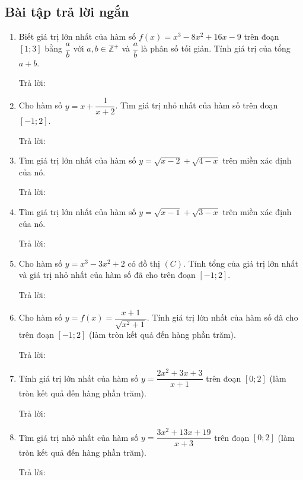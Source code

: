 \documentclass[12pt]{article}
\newcommand{\otraloi}{\underline{\hspace{5cm}}}
\begin{document}
	
	\subsection{Bài tập trả lời ngắn}

	\begin{enumerate}[label=\textbf{Câu \arabic*.}]
		
		\item Biết giá trị lớn nhất của hàm số $f(x) = x^3 - 8x^2 + 16x - 9$ trên đoạn $[1; 3]$ bằng $\dfrac{a}{b}$ với $a, b \in \mathbb{Z}^+$ và $\dfrac{a}{b}$ là phân số tối giản. Tính giá trị của tổng $a+b$.
		\par Trả lời: \otraloi
		
		\item Cho hàm số $y = x + \dfrac{1}{x + 2}$. Tìm giá trị nhỏ nhất của hàm số trên đoạn $[-1; 2]$.
		\par Trả lời: \otraloi
		
		\item Tìm giá trị lớn nhất của hàm số $y = \sqrt{x - 2} + \sqrt{4 - x}$ trên miền xác định của nó.
		\par Trả lời: \otraloi
		
		\item Tìm giá trị lớn nhất của hàm số $y = \sqrt{x - 1} + \sqrt{3 - x}$ trên miền xác định của nó.
		\par Trả lời: \otraloi
		
		\item Cho hàm số $y = x^3 - 3x^2 + 2$ có đồ thị $(C)$. Tính tổng của giá trị lớn nhất và giá trị nhỏ nhất của hàm số đã cho trên đoạn $[-1; 2]$.
		\par Trả lời: \otraloi
		
		\item Cho hàm số $y = f(x) = \dfrac{x + 1}{\sqrt{x^2 + 1}}$. Tính giá trị lớn nhất của hàm số đã cho trên đoạn $[-1; 2]$ (làm tròn kết quả đến hàng phần trăm).
		\par Trả lời: \otraloi
		
		\item Tính giá trị lớn nhất của hàm số $y = \dfrac{2x^2 + 3x + 3}{x + 1}$ trên đoạn $[0; 2]$ (làm tròn kết quả đến hàng phần trăm).
		\par Trả lời: \otraloi
		
		\item Tìm giá trị nhỏ nhất của hàm số $y = \dfrac{3x^2 + 13x + 19}{x + 3}$ trên đoạn $[0; 2]$ (làm tròn kết quả đến hàng phần trăm).
		\par Trả lời: \otraloi
		

\end{enumerate}
\end{document}
